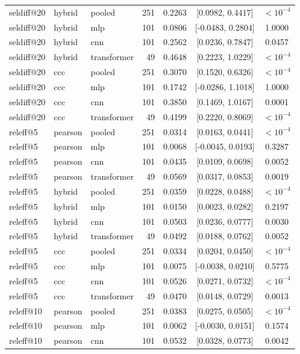 \begin{longtable}{lllrrcc}
seldiff@20 & hybrid & pooled & 251 & 0.2263 & [0.0982, 0.4417] & $<10^{-4}$ \\
seldiff@20 & hybrid & mlp & 101 & 0.0806 & [-0.0483, 0.2804] & 1.0000 \\
seldiff@20 & hybrid & cnn & 101 & 0.2562 & [0.0236, 0.7847] & 0.0457 \\
seldiff@20 & hybrid & transformer & 49 & 0.4648 & [0.2223, 1.0229] & $<10^{-4}$ \\
seldiff@20 & ccc & pooled & 251 & 0.3070 & [0.1520, 0.6326] & $<10^{-4}$ \\
seldiff@20 & ccc & mlp & 101 & 0.1742 & [-0.0286, 1.1018] & 1.0000 \\
seldiff@20 & ccc & cnn & 101 & 0.3850 & [0.1469, 1.0167] & 0.0001 \\
seldiff@20 & ccc & transformer & 49 & 0.4199 & [0.2220, 0.8069] & $<10^{-4}$ \\
releff@5 & pearson & pooled & 251 & 0.0314 & [0.0163, 0.0441] & $<10^{-4}$ \\
releff@5 & pearson & mlp & 101 & 0.0068 & [-0.0045, 0.0193] & 0.3287 \\
releff@5 & pearson & cnn & 101 & 0.0435 & [0.0109, 0.0698] & 0.0052 \\
releff@5 & pearson & transformer & 49 & 0.0569 & [0.0317, 0.0853] & 0.0019 \\
releff@5 & hybrid & pooled & 251 & 0.0359 & [0.0228, 0.0488] & $<10^{-4}$ \\
releff@5 & hybrid & mlp & 101 & 0.0150 & [0.0023, 0.0282] & 0.2197 \\
releff@5 & hybrid & cnn & 101 & 0.0503 & [0.0236, 0.0777] & 0.0030 \\
releff@5 & hybrid & transformer & 49 & 0.0492 & [0.0188, 0.0762] & 0.0052 \\
releff@5 & ccc & pooled & 251 & 0.0334 & [0.0204, 0.0450] & $<10^{-4}$ \\
releff@5 & ccc & mlp & 101 & 0.0075 & [-0.0038, 0.0210] & 0.5775 \\
releff@5 & ccc & cnn & 101 & 0.0526 & [0.0271, 0.0732] & $<10^{-4}$ \\
releff@5 & ccc & transformer & 49 & 0.0470 & [0.0148, 0.0729] & 0.0013 \\
releff@10 & pearson & pooled & 251 & 0.0383 & [0.0275, 0.0505] & $<10^{-4}$ \\
releff@10 & pearson & mlp & 101 & 0.0062 & [-0.0030, 0.0151] & 0.1574 \\
releff@10 & pearson & cnn & 101 & 0.0532 & [0.0328, 0.0773] & 0.0042 \\

\end{longtable}
